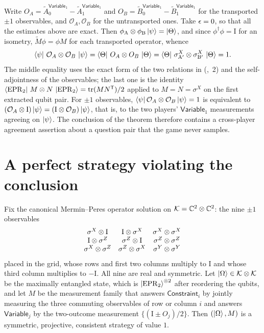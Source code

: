 \documentclass[11pt]{article}
\newcommand{\EPR}{\mathrm{EPR}}
\newcommand{\Id}{\mathrm{I}}
\newcommand{\Constraint}{\mathsf{Constraint}}
\newcommand{\Variable}{\mathsf{Variable}}
\begin{document}
Write $O_A = \tilde A^{\Variable_1}_0 - \tilde A^{\Variable_1}_1$ and
$O_B = \tilde B^{\Variable_1}_0 - \tilde B^{\Variable_1}_1$ for the transported
$\pm 1$ observables, and $\mathcal O_A, \mathcal O_B$ for the untransported
ones.  Take $\epsilon = 0$, so that all the estimates above are exact.  Then
$\phi_{\mathrm A} \otimes \phi_{\mathrm B}\ket{\psi} = \ket{\Theta}$, and since
$\phi^\dagger \phi = \Id$ for an isometry, $\tilde M \phi = \phi M$ for each
transported operator, whence
\begin{equation}
  \bra{\psi}\,\mathcal O_A \otimes \mathcal O_B\,\ket{\psi}
  = \bra{\Theta}\, O_A \otimes O_B \,\ket{\Theta}
  = \bra{\Theta}\, \sigma^X_{\mathrm A'} \otimes \sigma^X_{\mathrm B'}
    \,\ket{\Theta}
  = 1 .
  \label{eq:forced-correlation}
\end{equation}
The middle equality uses the exact form of the two relations in
(,~2) and the self-adjointness of the observables; the
last one is the identity
$\bra{\EPR_2}\, M \ot N \,\ket{\EPR_2} = \tr(M N^{\mathsf T})/2$ applied to
$M = N = \sigma^X$ on the first extracted qubit pair.  For $\pm 1$ observables,
$\bra{\psi} \mathcal O_A \otimes \mathcal O_B \ket{\psi} = 1$ is equivalent to
$(\mathcal O_A \ot \Id)\ket{\psi} = (\Id \ot \mathcal O_B)\ket{\psi}$, that is,
to the two players' $\Variable_1$ measurements agreeing on $\ket{\psi}$.  The
conclusion of the theorem therefore contains a cross-player agreement
assertion about a question pair that the game never samples.

\section{A perfect strategy violating the conclusion}
\label{sec:counterexample}

Fix the canonical Mermin--Peres operator solution on
$\mathcal K = \mathbb{C}^2 \otimes \mathbb{C}^2$: the nine $\pm 1$ observables
\[
  \begin{array}{ccc}
    \sigma^X \ot \Id & \Id \ot \sigma^X & \sigma^X \ot \sigma^X \\
    \Id \ot \sigma^Z & \sigma^Z \ot \Id & \sigma^Z \ot \sigma^Z \\
    \sigma^X \ot \sigma^Z & \sigma^Z \ot \sigma^X & \sigma^Y \ot \sigma^Y
  \end{array}
\]
placed in the grid, whose rows and first two columns multiply to $\Id$ and
whose third column multiplies to $-\Id$.  All nine are real and symmetric.  Let
$\ket{\Omega} \in \mathcal K \otimes \mathcal K$ be the maximally entangled state,
which is $\ket{\EPR_2}^{\ot 2}$ after reordering the qubits, and let $M$ be the
measurement family that answers $\Constraint_i$ by jointly measuring the three
commuting observables of row or column $i$ and answers $\Variable_j$ by the
two-outcome measurement $\{(\Id \pm O_j)/2\}$.  Then $(\ket{\Omega}, M)$ is a
symmetric, projective, consistent strategy of value $1$.
\end{document}
